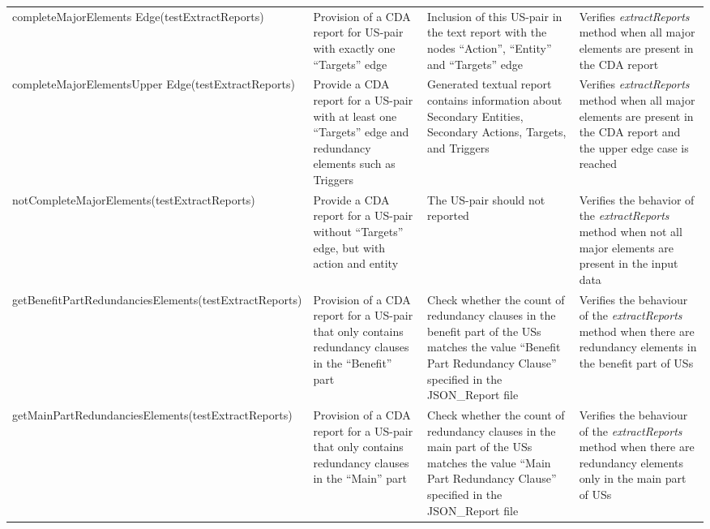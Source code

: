 \begin{tabularx}{\textwidth}{X  X  X  X}
			completeMajorElements \newline Edge\newline(testExtractReports)&Provision of a CDA report for US-pair with exactly one \enquote{Targets} edge&Inclusion of this US-pair in the text report with the nodes \enquote{Action}, \enquote{Entity} and \enquote{Targets} edge&Verifies \textit{extractReports} method when all major elements are present in the CDA report\\
			
			completeMajorElements\newline Upper Edge\newline(testExtractReports)&Provide a CDA report for a US-pair with at least one \enquote{Targets} edge and redundancy elements such as Triggers&Generated textual report contains information about Secondary Entities, Secondary Actions, Targets, and Triggers&Verifies \textit{extractReports} method when all major elements are present in the CDA report and the upper edge case is reached\\
			
			notCompleteMajor\newline Elements\newline(testExtractReports)&Provide a CDA report for a US-pair without \enquote{Targets} edge, but with action and entity&The US-pair should not reported&Verifies the behavior of the \textit{extractReports} method when not all major elements are present in the input data\\
			
			getBenefitPart\newline RedundanciesElements\newline(testExtractReports)&Provision of a CDA report for a US-pair that only contains redundancy clauses in the \enquote{Benefit} part&Check whether the count of redundancy clauses in the benefit part of the USs matches the value \enquote{Benefit Part Redundancy Clause} specified in the
			JSON\_Report file&Verifies the behaviour of the \textit{extractReports} method when there are redundancy elements in the benefit part of USs\\
			
			getMainPartRedundancies\newline Elements\newline(testExtractReports)&Provision of a CDA report for a US-pair that only contains redundancy clauses in the \enquote{Main} part&Check whether the count of redundancy clauses in the main part of the USs matches the value \enquote{Main Part Redundancy Clause} specified in the JSON\_Report file&Verifies the behaviour of the \textit{extractReports} method when there are redundancy elements only in the main part of USs\\
			

\end{tabularx}
